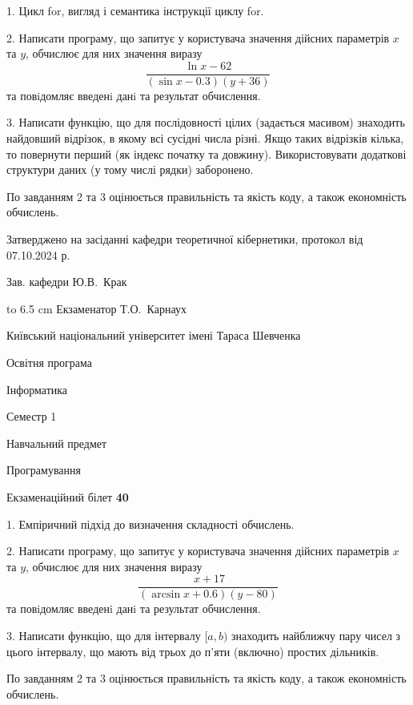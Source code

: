 \documentclass[12pt, ukrainian]{article}
\begin{document}
{%
1. Цикл for, вигляд і семантика інструкції циклу for.%
\par
2. Написати програму, що запитує у користувача значення дійсних параметрів $x$ та $y$, обчислює для них значення виразу 
$$\frac{\ln x - 62}{(\sin x - 0.3) (y + 36)}$$ 
та повiдомляє введенi данi та результат обчислення.

\par
3. Написати функцію, що для послідовності цілих (задається масивом) знаходить найдовший відрізок, в якому всі сусідні числа різні. Якщо таких відрізків кілька, то повернути перший (як індекс початку та довжину). Використовувати додаткові структури даних (у тому числі рядки) заборонено.

По завданням 2 та 3 оцінюється правильність та якість коду, а також економність обчислень.

}
{\smallskip\smallskip \begin {scriptsize} Затверджено на засіданні кафедри теоретичної кібернетики, протокол   від   07.10.2024 р.\par\smallskip\smallskip\smallskip\smallskip
{\parbox {6.5 cm} {Зав. кафедри \dotfill Ю.В.~Крак}}\hspace {0.7cm} {\hbox to 6.5 cm { Екзаменатор \dotfill Т.О.~Карнаух}} \end{scriptsize}}
\newpage
{{\begin {scriptsize}\par
{ \center  Київський національний університет імені Тараса Шевченка \par}
{\parbox {5 cm}{Освітня програма \hfill}{\parbox {7 cm}{Інформатика\hfill}}\parbox {6 cm}{\hfill Семестр 1}}\par
{\parbox {5 cm} {Навчальний предмет \hfill}\parbox {7 cm}{Програмування \hfill}\parbox {6cm}{\hfill}\par}\vspace{-15pt} \end{scriptsize}}{\center Екзаменаційний білет \No \textbf { 40 }\par}}
{%
1. Емпіричний підхід до визначення складності обчислень.%
\par
2. Написати програму, що запитує у користувача значення дійсних параметрів $x$ та $y$, обчислює для них значення виразу 
$$\frac{\ x + 17}{(\arcsin x + 0.6) (y - 80)}$$ 
та повiдомляє введенi данi та результат обчислення.

\par
3. Написати функцію, що для інтервалу $[a, b)$ знаходить найближчу пару чисел з цього інтервалу, що мають від трьох до п'яти (включно) простих дільників.

По завданням 2 та 3 оцінюється правильність та якість коду, а також економність обчислень.

}
\end{document}
